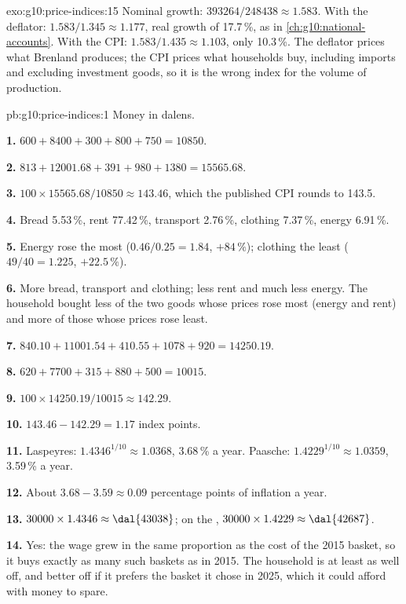 \begin{solution}{exo:g10:price-indices:15}
Nominal growth: $393264/248438 \approx 1.583$. With the deflator: $1.583/1.345 \approx 1.177$, real growth of 17.7\,\%, as in \cref{ch:g10:national-accounts}. With the CPI:
$1.583/1.435 \approx 1.103$, only 10.3\,\%. The deflator prices what Brenland produces; the CPI prices what households buy, including imports and excluding investment goods,
so it is the wrong index for the volume of production.
\end{solution}

\begin{solution}{pb:g10:price-indices:1}
Money in dalens.

\textbf{1.} $600 + 8400 + 300 + 800 + 750 = 10850$.

\textbf{2.} $813 + 12001.68 + 391 + 980 + 1380 = 15565.68$.

\textbf{3.} $100 \times 15565.68/10850 \approx 143.46$, which the published CPI rounds to 143.5.

\textbf{4.} Bread 5.53\,\%, rent 77.42\,\%, transport 2.76\,\%, clothing 7.37\,\%, energy 6.91\,\%.

\textbf{5.} Energy rose the most ($0.46/0.25 = 1.84$, $+84\,\%$); clothing the least ($49/40 = 1.225$, $+22.5\,\%$).

\textbf{6.} More bread, transport and clothing; less rent and much less energy. The household bought less of the two goods whose prices rose most (energy and rent) and more of
those whose prices rose least.

\textbf{7.} $840.10 + 11001.54 + 410.55 + 1078 + 920 = 14250.19$.

\textbf{8.} $620 + 7700 + 315 + 880 + 500 = 10015$.

\textbf{9.} $100 \times 14250.19/10015 \approx 142.29$.

\textbf{10.} $143.46 - 142.29 = 1.17$ index points.

\textbf{11.} Laspeyres: $1.4346^{1/10} \approx 1.0368$, 3.68\,\% a year. Paasche: $1.4229^{1/10} \approx 1.0359$, 3.59\,\% a year.

\textbf{12.} About $3.68 - 3.59 \approx 0.09$ percentage points of inflation a year.

\textbf{13.} $30000 \times 1.4346 \approx \text{\dal{43038}}$; on the , $30000 \times 1.4229 \approx \text{\dal{42687}}$.

\textbf{14.} Yes: the wage grew in the same proportion as the cost of the 2015 basket, so it buys exactly as many such baskets as in 2015. The household is at least as well off,
and better off if it prefers the basket it chose in 2025, which it could afford with money to spare.


\end{solution}
